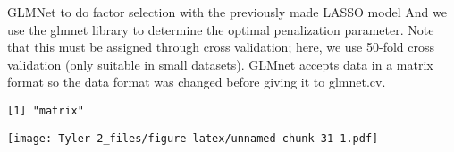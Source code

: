 \documentclass[12pt,]{article}
\newenvironment{Shaded}{\begin{snugshade}}{\end{snugshade}}
\newcommand{\CommentTok}[1]{\textcolor[rgb]{0.56,0.35,0.01}{\textit{#1}}}
\newcommand{\DataTypeTok}[1]{\textcolor[rgb]{0.13,0.29,0.53}{#1}}
\newcommand{\DecValTok}[1]{\textcolor[rgb]{0.00,0.00,0.81}{#1}}
\newcommand{\KeywordTok}[1]{\textcolor[rgb]{0.13,0.29,0.53}{\textbf{#1}}}
\newcommand{\NormalTok}[1]{#1}
\newcommand{\OperatorTok}[1]{\textcolor[rgb]{0.81,0.36,0.00}{\textbf{#1}}}
\newcommand{\StringTok}[1]{\textcolor[rgb]{0.31,0.60,0.02}{#1}}
\begin{document}
GLMNet to do factor selection with the previously made LASSO model And
we use the glmnet library to determine the optimal penalization
parameter. Note that this must be assigned through cross validation;
here, we use 50-fold cross validation (only suitable in small datasets).
GLMnet accepts data in a matrix format so the data format was changed
before giving it to glmnet.cv.

\begin{Shaded}
\end{Shaded}

\begin{verbatim}
[1] "matrix"
\end{verbatim}

\begin{Shaded}
\end{Shaded}

\texttt{[image: Tyler-2\_files/figure-latex/unnamed-chunk-31-1.pdf]}
\end{document}
